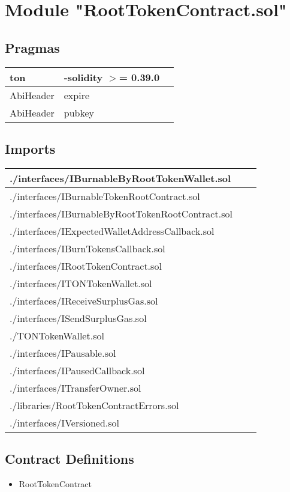 
\section{Module "RootTokenContract.sol"}


\subsection{Pragmas}


\noindent\begin{tabular}{|l|l|p{5cm}|}\hline
ton & -solidity $>$= 0.39.0 &\\\hline
AbiHeader &  expire &\\\hline
AbiHeader &  pubkey &\\\hline
\end{tabular}


\subsection{Imports}


\noindent\begin{tabular}{|l|l|p{5cm}|}\hline
./interfaces/IBurnableByRootTokenWallet.sol &\\\hline
./interfaces/IBurnableTokenRootContract.sol &\\\hline
./interfaces/IBurnableByRootTokenRootContract.sol &\\\hline
./interfaces/IExpectedWalletAddressCallback.sol &\\\hline
./interfaces/IBurnTokensCallback.sol &\\\hline
./interfaces/IRootTokenContract.sol &\\\hline
./interfaces/ITONTokenWallet.sol &\\\hline
./interfaces/IReceiveSurplusGas.sol &\\\hline
./interfaces/ISendSurplusGas.sol &\\\hline
./TONTokenWallet.sol &\\\hline
./interfaces/IPausable.sol &\\\hline
./interfaces/IPausedCallback.sol &\\\hline
./interfaces/ITransferOwner.sol &\\\hline
./libraries/RootTokenContractErrors.sol &\\\hline
./interfaces/IVersioned.sol &\\\hline
\end{tabular}


\subsection{Contract Definitions}

\begin{itemize}
\item RootTokenContract
\end{itemize}

